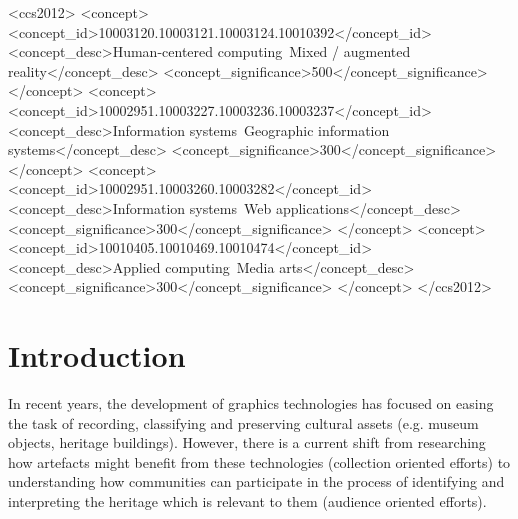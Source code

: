 \documentclass[acmlarge,screen,dvipsnames]{acmart}
\begin{document}
\begin{CCSXML} <ccs2012> <concept>
<concept_id>10003120.10003121.10003124.10010392</concept_id>
<concept_desc>Human-centered computing~Mixed / augmented
reality</concept_desc> <concept_significance>500</concept_significance>
</concept> <concept>
<concept_id>10002951.10003227.10003236.10003237</concept_id>
<concept_desc>Information systems~Geographic information
systems</concept_desc> <concept_significance>300</concept_significance>
</concept> <concept> <concept_id>10002951.10003260.10003282</concept_id>
<concept_desc>Information systems~Web applications</concept_desc>
<concept_significance>300</concept_significance> </concept> <concept>
<concept_id>10010405.10010469.10010474</concept_id> <concept_desc>Applied
computing~Media arts</concept_desc>
<concept_significance>300</concept_significance> </concept> </ccs2012>
\end{CCSXML}

  

\maketitle
\section{Introduction} 
\color{blue}

In recent years, the development of graphics
technologies has focused on easing the task of recording, classifying and
preserving cultural assets (e.g. museum objects, heritage buildings). However,
there is a current shift from researching how artefacts might benefit from these technologies (collection oriented efforts) to understanding how communities can
participate in the process of identifying and interpreting the heritage which is relevant to them (audience oriented efforts). 



\end{document}
